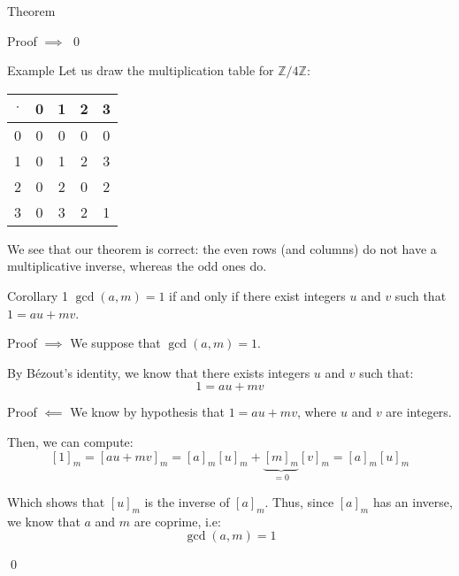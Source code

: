 \documentclass[a4paper]{article}
\begin{document}
\begin{parag}{Theorem}
\begin{subparag}{Proof $\implies$}
        \qed
    \end{subparag}

    \begin{subparag}{Example}
        Let us draw the multiplication table for $\mathbb{Z} / 4 \mathbb{Z}$:
        \begin{center}
        \begin{tabular}{c|cccc}
            $\cdot$ & 0 & 1 & 2 & 3 \\
            \hline
            0 & 0 & 0 & 0 & 0 \\
            1 & 0 & 1 & 2 & 3 \\
            2 & 0 & 2 & 0 & 2 \\
            3 & 0 & 3 & 2 & 1
        \end{tabular}
        \end{center}

        We see that our theorem is correct: the even rows (and columns) do not have a multiplicative inverse, whereas the odd ones do.
    \end{subparag}
\end{parag}

\begin{parag}{Corollary 1}
    $\gcd\left(a, m\right) = 1$ if and only if there exist integers $u$ and $v$ such that $1 = au + mv$.

    \begin{subparag}{Proof $\implies$}
        We suppose that $\gcd\left(a, m\right) = 1$.

        By Bézout's identity, we know that there exists integers $u$ and $v$ such that: 
        \[1 = au + mv\]
    \end{subparag}

    \begin{subparag}{Proof $\impliedby$}
        We know by hypothesis that $1 = au + mv$, where $u$ and $v$ are integers.

        Then, we can compute: 
        \[\left[1\right]_m = \left[au + mv\right]_m = \left[a\right]_m \left[u\right]_m + \underbrace{\left[m\right]_m}_{= 0} \left[v\right]_m = \left[a\right]_m \left[u\right]_m\]
        
        Which shows that $\left[u\right]_m$ is the inverse of $\left[a\right]_m$. Thus, since $\left[a\right]_m$ has an inverse, we know that $a$ and $m$ are coprime, i.e: 
        \[\gcd\left(a, m\right) = 1\]
        
        \qed
    \end{subparag}
\end{parag}
\end{document}
